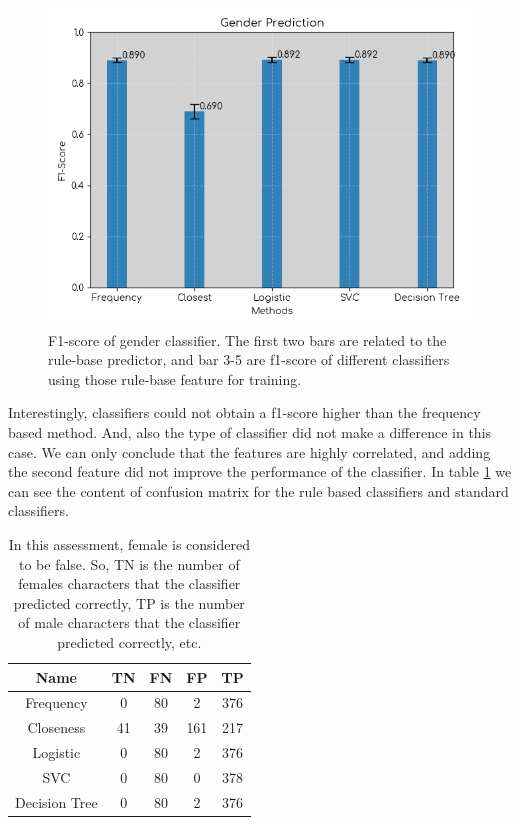 \documentclass[letterpaper]{article}
\begin{document}
\begin{figure}
	\centering
	\includegraphics[scale=.60]{gender_fscore_error.png}
	\caption{F1-score of gender classifier. The first two bars are related to the rule-base predictor, and bar 3-5 are f1-score of different classifiers using those rule-base feature for training.}
	\label{fig:gender}
\end{figure}


Interestingly, classifiers could not obtain a f1-score higher than the frequency based method. And, also the type of classifier did not make a difference in this case. We can only conclude that the features are highly correlated, and adding the second feature did not improve the performance of the classifier. In table \ref{tab:gender} we can see the content of confusion matrix for the rule based classifiers and standard classifiers. 


\begin{table}\label{tab:gender}
\centering
\begin{tabular}{ |c|c|c|c|c| } 
 \hline
 Name & TN & FN & FP & TP \\
 \hline
 Frequency &  0 & 80 & 2 & 376 \\
 Closeness & 41 & 39 & 161 & 217 \\
 Logistic &  0 & 80 & 2 & 376 \\
 SVC &  0 & 80 & 0 & 378 \\
 Decision Tree &  0 & 80 & 2 & 376 \\

 \hline
\end{tabular}
\caption{In this assessment, female is considered to be false. So, TN is the number of females characters that the classifier predicted correctly, TP is the number of male characters that the classifier predicted correctly, etc.}
\end{table}
\end{document}
